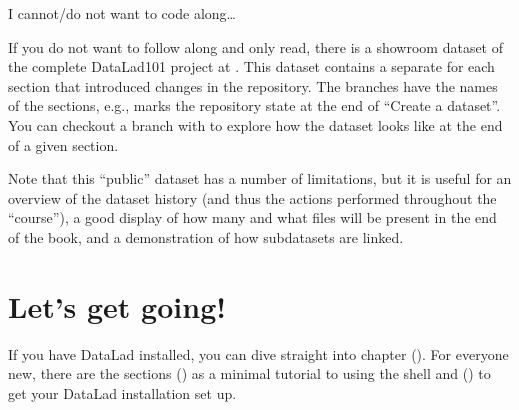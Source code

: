\begin{figure}[tbp]
\centering

\noindent{}
\end{figure}
\begin{findoutmore}[label={fom-lazy}, before title={\thetcbcounter\ }, float, check odd page=true]{I cannot/do not want to code along…}
\label{\detokenize{intro/narrative:fom-lazy}}

\sphinxAtStartPar
If you do not want to follow along and only read, there is a showroom dataset
of the complete DataLad\sphinxhyphen{}101 project at
.
This dataset contains a separate {\hyperref[\detokenize{glossary:term-branch}]{}} for each section that introduced changes
in the repository. The branches have the names of the sections, e.g.,
 marks the repository state at the end of “Create a dataset”. You can checkout a branch with 
to explore how the dataset looks like at the end of a given section.

\sphinxAtStartPar
Note that this “public” dataset has a number of limitations, but it is useful
for an overview of the dataset history (and thus the actions performed throughout
the “course”), a good display of how many and what files will be present in the
end of the book, and a demonstration of how subdatasets are linked.


\end{findoutmore}


\section{Let’s get going!}
\label{\detokenize{intro/narrative:let-s-get-going}}
\sphinxAtStartPar
If you have DataLad installed, you can dive straight into chapter {\hyperref[\detokenize{basics/101-101-create:createds}]{}} ().
For everyone new, there are the sections {\hyperref[\detokenize{intro/howto:howto}]{}} () as a minimal tutorial
to using the shell and {\hyperref[\detokenize{intro/installation:install}]{}} () to get your DataLad installation set up.

\sphinxstepscope


